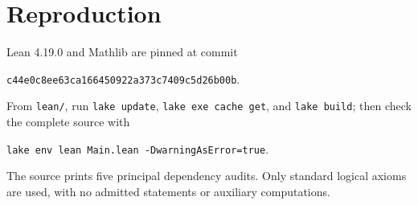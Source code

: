 \documentclass[11pt]{article}
\begin{document}
\section*{Reproduction}
Lean 4.19.0 and Mathlib are pinned at commit
\begin{center}\small\texttt{c44e0c8ee63ca166450922a373c7409c5d26b00b}.\end{center}
From \texttt{lean/}, run \texttt{lake update}, \texttt{lake exe cache get},
and \texttt{lake build}; then check the complete source with
\begin{center}\small\texttt{lake env lean Main.lean -DwarningAsError=true}.\end{center}
The source prints five principal dependency audits. Only standard logical
axioms are used, with no admitted statements or auxiliary computations.
\end{document}
